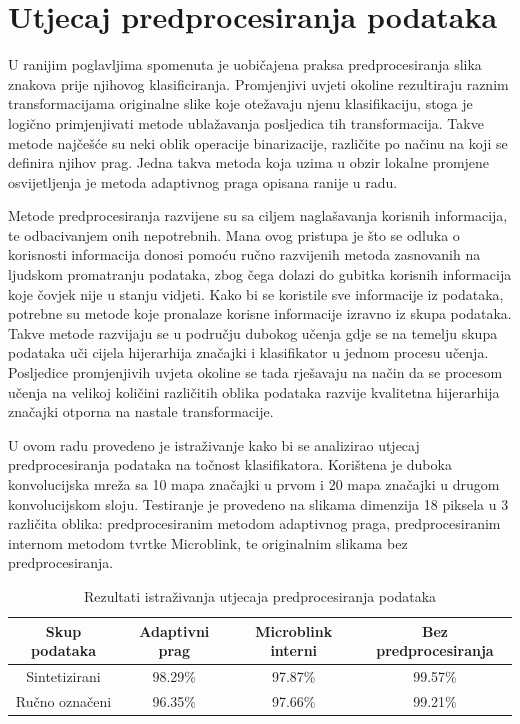 \documentclass[lmodern, utf8, diplomski, numeric]{fer}
\begin{document}
\section{Utjecaj predprocesiranja podataka}


U ranijim poglavljima spomenuta je uobičajena praksa predprocesiranja slika znakova prije njihovog klasificiranja. Promjenjivi uvjeti okoline rezultiraju raznim transformacijama originalne slike koje otežavaju njenu klasifikaciju, stoga je logično primjenjivati metode ublažavanja posljedica tih transformacija. Takve metode najčešće su neki oblik operacije binarizacije, različite po načinu na koji se definira njihov prag. Jedna takva metoda koja uzima u obzir lokalne promjene osvijetljenja je metoda adaptivnog praga opisana ranije u radu.

Metode predprocesiranja razvijene su sa ciljem naglašavanja korisnih informacija, te odbacivanjem onih nepotrebnih. Mana ovog pristupa je što se odluka o korisnosti informacija donosi pomoću ručno razvijenih metoda zasnovanih na ljudskom promatranju podataka, zbog čega dolazi do gubitka korisnih informacija koje čovjek nije u stanju vidjeti. Kako bi se koristile sve informacije iz podataka, potrebne su metode koje pronalaze korisne informacije izravno iz skupa podataka. Takve metode razvijaju se u području dubokog učenja gdje se na temelju skupa podataka uči cijela hijerarhija značajki i klasifikator u jednom procesu učenja. Posljedice promjenjivih uvjeta okoline se tada rješavaju na način da se procesom učenja na velikoj količini različitih oblika podataka razvije kvalitetna hijerarhija značajki otporna na nastale transformacije.

U ovom radu provedeno je istraživanje kako bi se analizirao utjecaj predprocesiranja podataka na točnost klasifikatora. Korištena je duboka konvolucijska mreža sa 10 mapa značajki u prvom i 20 mapa značajki u drugom konvolucijskom sloju. Testiranje je provedeno na slikama dimenzija 18 piksela u 3 različita oblika: predprocesiranim metodom adaptivnog praga, predprocesiranim internom metodom tvrtke Microblink, te originalnim slikama bez predprocesiranja.
 
\hspace{2em}
\begin{table}[ht!]
\begin{center}
\centering
    \begin{tabular}{ | c| c| c|c |}
    \hline
    Skup podataka & Adaptivni prag & Microblink interni & Bez predprocesiranja \\ \hline
    Sintetizirani & 98.29\% & 97.87\%  & 99.57\% \\ \hline
    Ručno označeni & 96.35\% & 97.66\% & 99.21\% \\  
    \hline
    \end{tabular}
\end{center}
\caption{Rezultati istraživanja utjecaja predprocesiranja podataka}
\label{tab:preproc}
\end{table}
\end{document}
